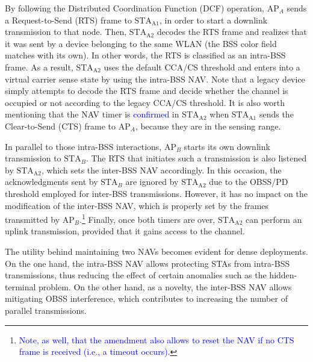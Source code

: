 \documentclass[comsoc]{IEEEtran}
\begin{document}
	By following the Distributed Coordination Function (DCF) operation, $\text{AP}_A$ sends a Request-to-Send (RTS) frame to $\text{STA}_\text{A1}$, in order to start a downlink transmission to that node. Then, $\text{STA}_\text{A2}$ decodes the RTS frame and realizes that it was sent by a device belonging to the same WLAN (the BSS color field matches with its own). In other words, the RTS is classified as an intra-BSS frame. As a result, $\text{STA}_\text{A2}$ uses the default CCA/CS threshold and enters into a virtual carrier sense state by using the intra-BSS NAV. Note that a legacy device simply attempts to decode the RTS frame and decide whether the channel is occupied or not according to the legacy CCA/CS threshold. It is also worth mentioning that the NAV timer is \textcolor{blue}{confirmed} in $\text{STA}_\text{A2}$ when $\text{STA}_\text{A1}$ sends the Clear-to-Send (CTS) frame to $\text{AP}_A$, because they are in the sensing range. 
	
	
	In parallel to those intra-BSS interactions, $\text{AP}_B$ starts its own downlink transmission to $\text{STA}_B$. The RTS that initiates such a transmission is also listened by $\text{STA}_\text{A2}$, which sets the inter-BSS NAV accordingly. In this occasion, the acknowledgments sent by $\text{STA}_B$ are ignored by $\text{STA}_\text{A2}$ due to the OBSS/PD threshold employed for inter-BSS transmissions. However, it has no impact on the modification of the inter-BSS NAV, which is properly set by the frames transmitted by $\text{AP}_B$.\footnote{\textcolor{blue}{Note, as well, that the amendment also allows to reset the NAV if no CTS frame is received (i.e., a timeout occurs).}} Finally, once both timers are over, $\text{STA}_\text{A2}$ can perform an uplink transmission, provided that it gains access to the channel.
		
	The utility behind maintaining two NAVs becomes evident for dense deployments. On the one hand, the intra-BSS NAV allows protecting STAs from intra-BSS transmissions, thus reducing the effect of certain anomalies such as the hidden-terminal problem. On the other hand, as a novelty, the inter-BSS NAV allows mitigating OBSS interference, which contributes to increasing the number of parallel transmissions. 
	
\end{document}
